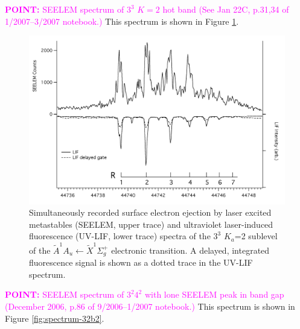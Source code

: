 \documentclass[12pt,draft]{mitthesis}
\newcommand{\POINT}[1]{\textcolor{magenta}{\textbf{POINT:} #1}}
\begin{document}
\POINT{SEELEM spectrum of $3^3$ $K=2$ hot band (See Jan 22C, p.31,34
  of 1/2007--3/2007 notebook.)}  This spectrum is shown in Figure
\ref{fig:spectrum-33k2}.

\begin{figure}
  \caption{
    Simultaneously recorded surface electron ejection by laser excited
    metastables (SEELEM, upper trace) and ultraviolet laser-induced
    fluorescence (UV-LIF, lower trace) spectra of the $3^3$ $K_a$=2
    sublevel of the $\tilde{A}^1A_u \leftarrow \tilde{X} ^1\Sigma_g^+$
    electronic transition. A delayed, integrated fluorescence signal
    is shown as a dotted trace in the UV-LIF spectrum.}
  \label{fig:spectrum-33k2}
  \centering
  \includegraphics[width=8in,angle=90]{spectrum-33k2.png}
\end{figure}

\POINT{SEELEM spectrum of $3^2 4^2$ with lone SEELEM peak in band gap
  (December 2006, p.86 of 9/2006--1/2007 notebook.)}  This spectrum is
shown in Figure \ref{fig:spectrum-32b2}.
\end{document}
